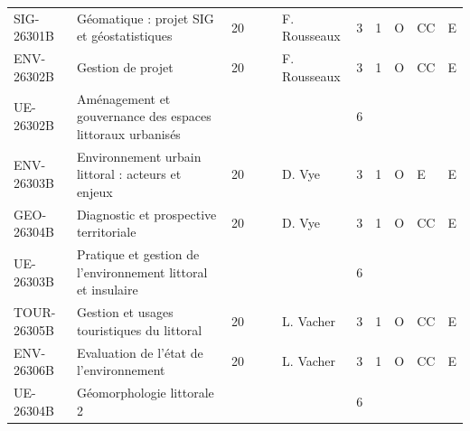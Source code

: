 \documentclass[a4paper,11pt]{article}
\begin{document}
{{\begin{tabular}{lllllllllll}
SIG-26301B                         & Géomatique : projet SIG et géostatistiques                   & 20 &    &                           & F. Rousseaux                       & 3    & 1    & O           & CC                                    & E                         \\
ENV-26302B                         & Gestion de projet                                            & 20 &    &                           & F. Rousseaux                       & 3    & 1    & O           & CC                                    & E                         \\
\rowcolor[HTML]{EFEFEF} 
UE-26302B                          & Aménagement et gouvernance des espaces littoraux urbanisés   &    &    &                           &                                    & 6    &      &             &                                       &                           \\
ENV-26303B                         & Environnement urbain littoral : acteurs et enjeux            & 20 &    &                           & D. Vye                             & 3    & 1    & O           & E                                     & E                         \\
GEO-26304B                         & Diagnostic et prospective territoriale                       & 20 &    &                           & D. Vye                             & 3    & 1    & O           & CC                                    & E                         \\
\rowcolor[HTML]{EFEFEF} 
UE-26303B                          & Pratique et gestion de l'environnement littoral et insulaire &    &    &                           &                                    & 6    &      &             &                                       &                           \\
TOUR-26305B                        & Gestion et usages touristiques du littoral                   & 20 &    &                           & L. Vacher                          & 3    & 1    & O           & CC                                    & E                         \\
ENV-26306B                         & Evaluation de l'état de l'environnement                      & 20 &    &                           & L. Vacher                          & 3    & 1    & O           & CC                                    & E                         \\
\rowcolor[HTML]{EFEFEF} 
UE-26304B                          & Géomorphologie littorale 2                                   &    &    &                           &                                    & 6    &      &             &                                       &                           \\

\end{tabular}}}
\end{document}
